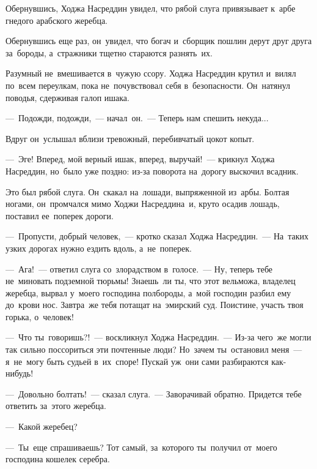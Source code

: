 \documentclass[12pt,a4paper]{book}
\begin{document}
Обернувшись, Ходжа Насреддин увидел, что рябой слуга привязывает к~арбе гнедого арабского жеребца.

Обернувшись еще раз, он~увидел, что богач и~сборщик пошлин дерут друг друга за~бороды, а~стражники тщетно стараются разнять~их.

Разумный не~вмешивается в~чужую ссору. Ходжа Насреддин крутил и~вилял по~всем переулкам, пока не~почувствовал себя в~безопасности. Он~натянул поводья, сдерживая галоп ишака.

—~Подожди, подожди,~— начал~он.~— Теперь нам спешить некуда...

Вдруг он~услышал вблизи тревожный, перебивчатый цокот копыт.

—~Эге! Вперед, мой верный ишак, вперед, выручай!~— крикнул Ходжа Насреддин, но~было уже поздно: из-за поворота на~дорогу выскочил всадник.

Это был рябой слуга. Он~скакал на~лошади, выпряженной из~арбы. Болтая ногами, он~промчался мимо Ходжи Насреддина~и, круто осадив лошадь, поставил ее~поперек дороги.

—~Пропусти, добрый человек,~— кротко сказал Ходжа Насреддин.~— На~таких узких дорогах нужно ездить вдоль, а~не~поперек.

—~Ага!~— ответил слуга со~злорадством в~голосе.~— Ну, теперь тебе не~миновать подземной тюрьмы! Знаешь~ли ты, что этот вельможа, владелец жеребца, вырвал у~моего господина полбороды, а~мой господин разбил ему до~крови нос. Завтра~же тебя потащат на~эмирский суд. Поистине, участь твоя горька, о~человек!

—~Что ты~говоришь?!~— воскликнул Ходжа Насреддин.~— Из-за чего~же могли так сильно поссориться эти почтенные люди? Но~зачем ты~остановил меня~— я~не~могу быть судьей в~их~споре! Пускай уж~они сами разбираются как-нибудь!

—~Довольно болтать!~— сказал слуга.~— Заворачивай обратно. Придется тебе ответить за~этого жеребца.

—~Какой жеребец?

—~Ты~еще спрашиваешь? Тот самый, за~которого ты~получил от~моего господина кошелек серебра.
\end{document}
